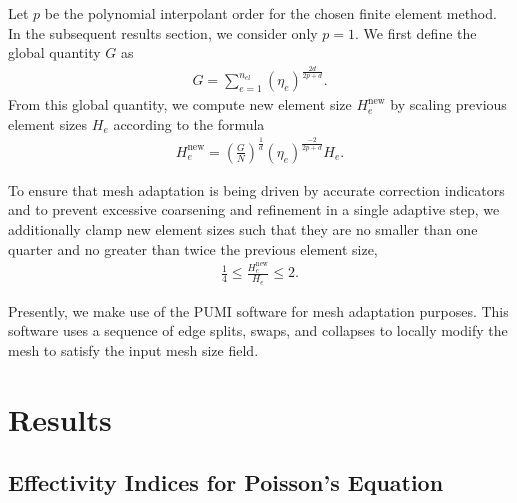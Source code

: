 Let $p$ be the polynomial interpolant order for the chosen finite element
method. In the subsequent results section, we consider only $p=1$. We first
define the global quantity $G$ as
%
\begin{gather}
G = \sum_{e=1}^{n_{el}} ( \eta_e ) ^{\frac{2d}{2p+d}}.
\label{eq:refine_global_size}
\end{gather}
%
From this global quantity, we compute new element size $H_e^{\text{new}}$
by scaling previous element sizes $H_e$ according to the formula
%
\begin{gather}
H_e^{\text{new}} = \left( \frac{G}{N} \right)^{\frac{1}{d}}
( \eta_e )^{\frac{-2}{2p + d}} H_e.
\label{eq:refine_size_field}
\end{gather}

To ensure that mesh adaptation is being driven by accurate correction indicators
and to prevent excessive coarsening and refinement in a single adaptive step,
we additionally clamp new element sizes such that they are no smaller than one
quarter and no greater than twice the previous element size,
%
\begin{gather}
\frac14 \leq \frac{H_e^{\text{new}}}{H_e} \leq 2.
\label{eq:refine_size_clamping}
\end{gather}

Presently, we make use of the PUMI \cite{ibanez2016pumi} software
for mesh adaptation purposes. This software uses a sequence of edge splits,
swaps, and collapses \cite{li20053d, alauzet2006parallel} to locally modify
the mesh to satisfy the input mesh size field.

\section{Results}

\subsection{Effectivity Indices for Poisson's Equation}

